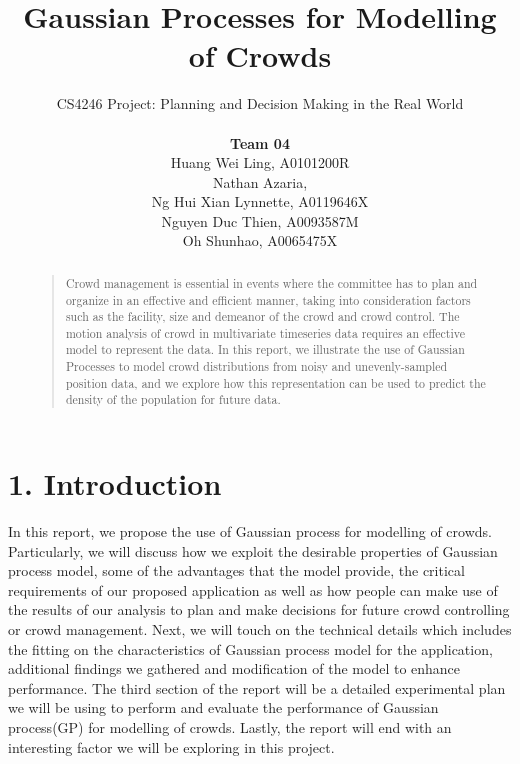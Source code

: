 \documentclass[letterpaper]{article}
\begin{document}
%
\title{Gaussian Processes for Modelling of Crowds}
\author{CS4246 Project: Planning and Decision Making in the Real World  \\ \\
{\bf Team 04} \\
Huang Wei Ling, A0101200R\\
Nathan Azaria, \\
Ng Hui Xian Lynnette, A0119646X\\
Nguyen Duc Thien, A0093587M\\
Oh Shunhao, A0065475X\\
}
\maketitle
\begin{abstract}
\begin{quote}
Crowd management is essential in events where the committee has to plan and organize in an effective and efficient manner, taking into consideration factors such as the facility, size and demeanor of the crowd and crowd control. The motion analysis of crowd in multivariate timeseries data requires an effective model to represent the data. In this report, we illustrate the use of Gaussian Processes to model crowd distributions from noisy and unevenly-sampled position data, and we explore how this representation can be used to predict the density of the population for future data.
\end{quote}
\end{abstract}

\section{1.  Introduction}
In this report, we propose the use of Gaussian process for modelling of crowds. Particularly, we will discuss how we exploit the desirable properties of Gaussian process model, some of the advantages that the model provide, the critical requirements of our proposed application as well as how people can make use of the results of our analysis to plan and make decisions for future crowd controlling or crowd management. Next, we will touch on the technical details which includes the fitting on the characteristics of Gaussian process model for the application, additional findings we gathered and modification of the model to enhance performance. The third section of the report will be a detailed experimental plan we will be using to perform and evaluate the performance of Gaussian process(GP) for modelling of crowds. Lastly, the report will end with an interesting factor we will be exploring in this project.
\end{document}
